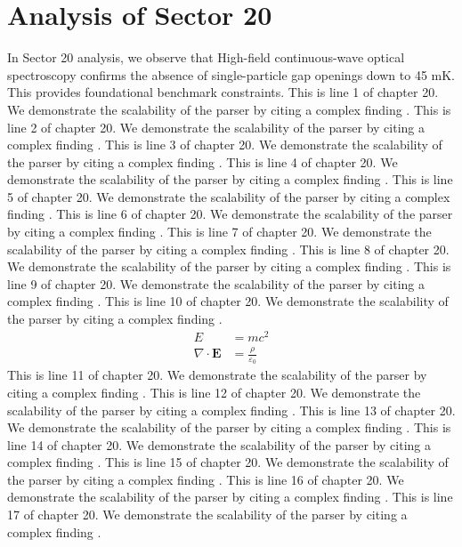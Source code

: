 \chapter{Analysis of Sector 20}

In Sector 20 analysis, we observe that High-field continuous-wave optical spectroscopy confirms the absence of single-particle gap openings down to 45 mK. This provides foundational benchmark constraints.
This is line 1 of chapter 20. We demonstrate the scalability of the parser by citing a complex finding \cite{ref20_1}.
This is line 2 of chapter 20. We demonstrate the scalability of the parser by citing a complex finding \cite{ref20_2}.
This is line 3 of chapter 20. We demonstrate the scalability of the parser by citing a complex finding \cite{ref20_3}.
This is line 4 of chapter 20. We demonstrate the scalability of the parser by citing a complex finding \cite{ref20_4}.
This is line 5 of chapter 20. We demonstrate the scalability of the parser by citing a complex finding \cite{ref20_5}.
This is line 6 of chapter 20. We demonstrate the scalability of the parser by citing a complex finding \cite{ref20_6}.
This is line 7 of chapter 20. We demonstrate the scalability of the parser by citing a complex finding \cite{ref20_7}.
This is line 8 of chapter 20. We demonstrate the scalability of the parser by citing a complex finding \cite{ref20_8}.
This is line 9 of chapter 20. We demonstrate the scalability of the parser by citing a complex finding \cite{ref20_9}.
This is line 10 of chapter 20. We demonstrate the scalability of the parser by citing a complex finding \cite{ref20_10}.
\begin{align*}
  E &= mc^2 \\
  \nabla \cdot \mathbf{E} &= \frac{\rho}{\varepsilon_0}
\end{align*}
This is line 11 of chapter 20. We demonstrate the scalability of the parser by citing a complex finding \cite{ref20_11}.
This is line 12 of chapter 20. We demonstrate the scalability of the parser by citing a complex finding \cite{ref20_12}.
This is line 13 of chapter 20. We demonstrate the scalability of the parser by citing a complex finding \cite{ref20_13}.
This is line 14 of chapter 20. We demonstrate the scalability of the parser by citing a complex finding \cite{ref20_14}.
This is line 15 of chapter 20. We demonstrate the scalability of the parser by citing a complex finding \cite{ref20_15}.
This is line 16 of chapter 20. We demonstrate the scalability of the parser by citing a complex finding \cite{ref20_16}.
This is line 17 of chapter 20. We demonstrate the scalability of the parser by citing a complex finding \cite{ref20_17}.
